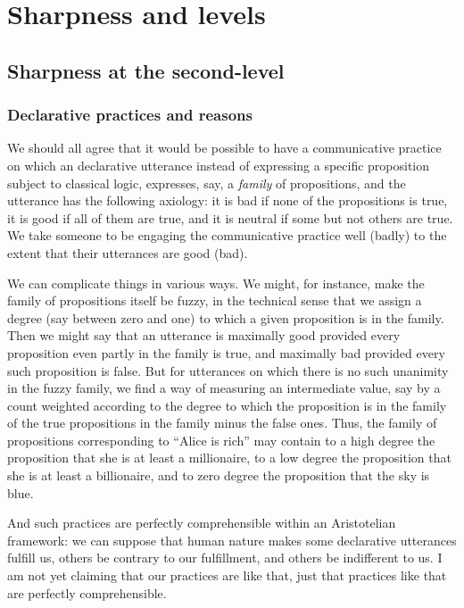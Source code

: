 \section{Sharpness and levels}
\subsection{Sharpness at the second-level}\label{sec:limiting}
\subsubsection{Declarative practices and reasons}
We should all agree that it would be possible to have a communicative practice on which an declarative utterance instead of expressing 
a specific proposition subject to classical logic, expresses, say, a \textit{family} of propositions, and the utterance has the following
axiology: it is bad if none of the propositions is true, it is good if all of them are true, and it is neutral if some but not others are
true. We take someone to be engaging the communicative practice well (badly) to the extent that their utterances are good (bad).

We can complicate things in various ways. We might, for instance, make the family of propositions itself be fuzzy, in the technical sense that we assign
a degree (say between zero and one) to which a given proposition is in the family. Then we might say that an utterance is maximally good provided every proposition
even partly in the family is true, and maximally bad provided every such proposition is false. But for utterances on which there is no
such unanimity in the fuzzy family, we find a way of measuring an intermediate value, say by a count weighted according to the degree 
to which the proposition is in the family of the true propositions in the family minus the false ones. Thus, the family of propositions
corresponding to ``Alice is rich'' may contain to a high degree the proposition that she is at least a millionaire, to a low degree 
the proposition that she is at least a billionaire, and to zero degree the proposition that the sky is blue. 

And such practices are perfectly 
comprehensible within an Aristotelian framework: we can suppose that human nature makes some declarative utterances fulfill us, others
be contrary to our fulfillment, and others be indifferent to us.
I am not yet claiming that our practices are like that, just that practices like that are perfectly comprehensible.

